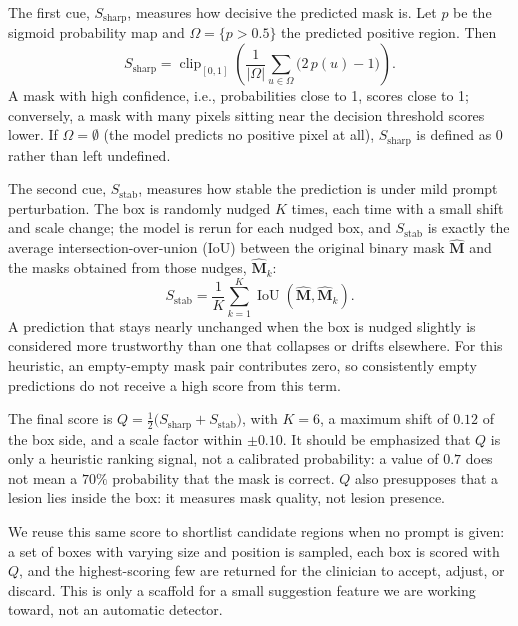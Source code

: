 The first cue, $S_{\mathrm{sharp}}$, measures how decisive the predicted mask is. Let $p$ be the sigmoid probability map and $\Omega=\{p>0.5\}$ the predicted positive region. Then
\begin{equation}
S_{\mathrm{sharp}} = \operatorname{clip}_{[0,1]}\!\left(\frac{1}{|\Omega|}\sum_{u\in\Omega}\bigl(2\,p(u)-1\bigr)\right).
\end{equation}
A mask with high confidence, i.e., probabilities close to 1, scores close to 1; conversely, a mask with many pixels sitting near the decision threshold scores lower. If $\Omega=\emptyset$ (the model predicts no positive pixel at all), $S_{\mathrm{sharp}}$ is defined as $0$ rather than left undefined.

The second cue, $S_{\mathrm{stab}}$, measures how stable the prediction is under mild prompt perturbation. The box is randomly nudged $K$ times, each time with a small shift and scale change; the model is rerun for each nudged box, and $S_{\mathrm{stab}}$ is exactly the average intersection-over-union (IoU) between the original binary mask $\hat{\mathbf{M}}$ and the masks obtained from those nudges, $\hat{\mathbf{M}}_k$:
\begin{equation}
S_{\mathrm{stab}} = \frac{1}{K}\sum_{k=1}^{K}\operatorname{IoU}\!\left(\hat{\mathbf{M}},\hat{\mathbf{M}}_k\right).
\end{equation}
A prediction that stays nearly unchanged when the box is nudged slightly is considered more trustworthy than one that collapses or drifts elsewhere. For this heuristic, an empty-empty mask pair contributes zero, so consistently empty predictions do not receive a high score from this term.

The final score is $Q=\tfrac{1}{2}\bigl(S_{\mathrm{sharp}}+S_{\mathrm{stab}}\bigr)$, with $K=6$, a maximum shift of $0.12$ of the box side, and a scale factor within $\pm0.10$. It should be emphasized that $Q$ is only a heuristic ranking signal, not a calibrated probability: a value of $0.7$ does not mean a $70\%$ probability that the mask is correct. $Q$ also presupposes that a lesion lies inside the box: it measures mask quality, not lesion presence.

We reuse this same score to shortlist candidate regions when no prompt is given: a set of boxes with varying size and position is sampled, each box is scored with $Q$, and the highest-scoring few are returned for the clinician to accept, adjust, or discard. This is only a scaffold for a small suggestion feature we are working toward, not an automatic detector.
